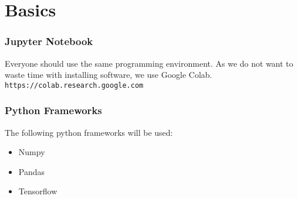 \section{Basics}

\begin{frame}[fragile]
  \frametitle{Jupyter Notebook}
  Everyone should use the same programming environment. As we do not want to waste time with
  installing software, we use Google Colab.\\
  \verb|https://colab.research.google.com|
  
\end{frame}


\begin{frame}[fragile]
  \frametitle{Python Frameworks}
  The following python frameworks will be used:
  \begin{itemize}
  \item Numpy
  \item Pandas
  \item Tensorflow
  \end{itemize}
\end{frame}
